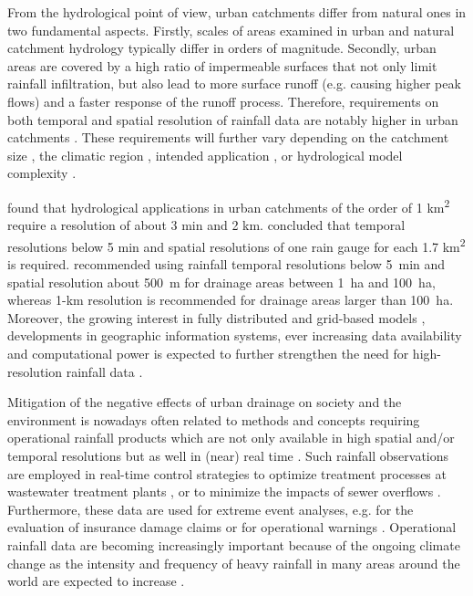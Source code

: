 \documentclass{ctuthesis}\usepackage[]{graphicx}\usepackage[]{color}
\begin{document}
From the hydrological point of view, urban catchments differ from natural ones in two fundamental aspects. Firstly, scales of areas examined in urban and natural catchment hydrology typically differ in orders of magnitude. Secondly, urban areas are covered by a high ratio of impermeable surfaces that not only limit rainfall infiltration, but also lead to more surface runoff (e.g. causing higher peak flows) and a faster response of the runoff process. Therefore, requirements on both temporal and spatial resolution of rainfall data are notably higher in urban catchments \citep[e.g.][]{schilling1991rainfall, berneTemporalSpatialResolution2004}. These requirements will further vary depending on the catchment size \citep{ochoa-rodriguezImpactSpatialTemporal2015}, the climatic region \citep{berneTemporalSpatialResolution2004}, intended application \citep[e.g. long-term analysis vs. online nowcasting][]{einfaltRoadmapUseRadar2004}, or hydrological model complexity \citep[semi- vs. fully-distributed][]{giresImpactsSmallScale2015}. 

\cite{berneTemporalSpatialResolution2004} found that hydrological applications in urban catchments of the order of 1 km\textsuperscript{2} require a resolution of about 3 min and 2 km. \cite{notaroImpactRainfallData2013} concluded that temporal resolutions below 5 min and spatial resolutions of one rain gauge for each 1.7 km\textsuperscript{2} is required.  \cite{ochoa-rodriguezImpactSpatialTemporal2015} recommended using rainfall temporal resolutions below 5~min and spatial resolution about 500~m for drainage areas between 1~ha and 100~ha, whereas 1-km resolution is recommended  for drainage areas larger than 100~ha. Moreover, the growing interest in fully distributed and grid-based models \citep{ochoa-rodriguezImpactSpatialTemporal2015, ichibaScaleEffectChallenges2018}, developments in geographic information systems, ever increasing data availability and computational power is expected to further strengthen the need for high-resolution rainfall data \citep{ochoa-rodriguezReviewRadarRain2019, salvadoreHydrologicalModellingUrbanized2015}. 

Mitigation of the negative effects of urban drainage on society and the environment is nowadays often related to methods and concepts requiring operational rainfall products which are not only available in  high spatial and/or temporal resolutions but as well in (near) real time \citep{einfaltRoadmapUseRadar2004}. Such rainfall observations are employed in real-time control strategies to optimize treatment processes at wastewater treatment plants \citep{schutzeRealTimeControl2004}, or to minimize the impacts of sewer overflows \citep{vezzaroGeneralisedDynamicOverflow2014}. Furthermore, these data are used for extreme event analyses, e.g. for the evaluation of insurance damage claims \citep{spekkersStatisticalAnalysisInsurance2013} or for operational warnings \citep{montesarchioRainfallThresholdsFlood2009}. Operational rainfall data are becoming increasingly important because of the ongoing climate change \citep{vanderpolImpactsRainfallVariability2015} as the intensity and frequency of heavy rainfall in many areas around the world are expected to increase \citep{willemsClimateChangeImpact2012}.
\end{document}
